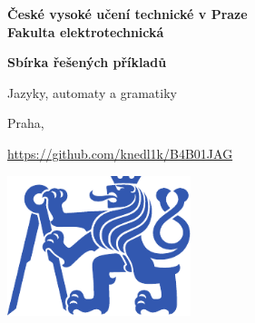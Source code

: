 \documentclass[11pt,a4paper]{article}
\begin{document}
 

\begin{titlepage}
    \centering
    \vspace*{2cm}

    {\Large \textbf{České vysoké učení technické v Praze}\\}
    \vspace{0.2cm}
    {\Large \textbf{Fakulta elektrotechnická}\\}
    
    \vspace{1cm}
    {\Huge \textbf{Sbírka řešených příkladů}\\}

    \vspace{0.5cm}
    {\Large Jazyky, automaty a gramatiky\\}

    \vspace{2cm}
    { Praha, \the\year\\}

    \vspace{2cm}
    { \url{https://github.com/knedl1k/B4B01JAG}}

    \vspace{2cm}
    \includegraphics[width=0.4\textwidth]{media/symbol_cvut_plna_samostatna_verze_Pantone.pdf}

    \vfill
    
\end{titlepage}

\clearpage
{}
\setcounter{page}{1}

\tableofcontents
{}

\clearpage
{}
\setcounter{page}{1} 





 
\end{document}

